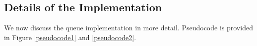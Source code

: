 \subsection{Details of the Implementation}

We now discuss the queue implementation in more detail.  Pseudocode is provided in Figure \ref{pseudocode1} and \ref{pseudocode2}.

\renewcommand{\algorithmiccomment}[1]{\hfill\eqparbox{COMMENTDOUBLE}{\com\ #1}}
\newcommand{\hangbox}[1]{\parbox[t]{\dimexpr\linewidth-\algorithmicindent\relax}{%
    \setlength{\hangindent}{\algorithmicindent}%
    #1}}
\newcommand{\spac}{\medskip}
\newcommand{\assign}{\mbox{:=}}

